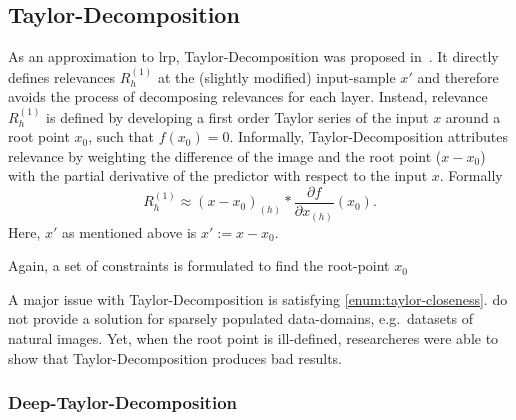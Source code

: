 \subsection{Taylor-Decomposition}
As an approximation to \gls{lrp}, Taylor-Decomposition was proposed in~\cite{Bach.2015}. It directly defines relevances \(R_{h}^{(1)}\) at the (slightly modified) input-sample \(x'\) and therefore avoids the process of decomposing relevances for each layer. Instead, relevance \(R_{h}^{(1)}\) is defined by developing a first order Taylor series of the input \(x\) around a root point \(x_0\), such that \(f(x_0) = 0\). Informally, Taylor-Decomposition attributes relevance by weighting the difference of the image and the root point (\(x-x_0\)) with the partial derivative of the predictor with respect to the input \(x\). Formally
\begin{equation}
    R_{h}^{(1)} \approx (x-x_0)_{(h)} * \frac{\partial f}{\partial x_{(h)}}(x_0).
\end{equation}
Here, \(x'\) as mentioned above is \(x':=x-x_0\).
\par
Again, a set of constraints is formulated to find the root-point \(x_0\)
A major issue with Taylor-Decomposition is satisfying \cref{enum:taylor-closeness}.  do not provide a solution for sparsely populated data-domains, e.g.\ datasets of natural images. Yet, when the root point is ill-defined, researcheres were able to show that Taylor-Decomposition produces bad results.

\subsubsection{Deep-Taylor-Decomposition}
\blindtext[1]